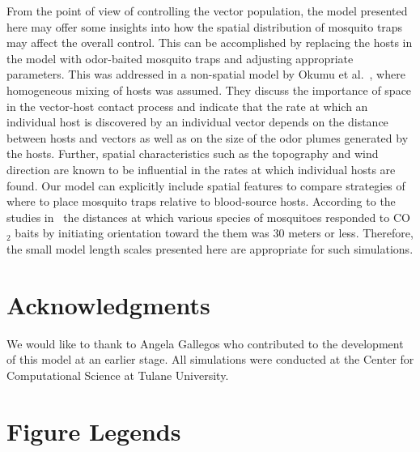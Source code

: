 \documentclass[10pt]{article}
\begin{document}
From the point of view of controlling the vector population, the model presented here may offer some insights into how the spatial distribution of mosquito traps may affect the overall control.  This can be accomplished by replacing the hosts in the model with odor-baited mosquito traps and adjusting appropriate parameters.  This was addressed in a non-spatial model by Okumu et al.~\cite{OkumuModel2010}, where homogeneous mixing of hosts was assumed.  They discuss the importance of space in the vector-host contact process and indicate that the rate at which an individual host is discovered by an individual vector depends on the distance between hosts and vectors as well as on the size of the odor plumes generated by the hosts.  Further, spatial characteristics such as the topography and wind direction are known to be influential in the rates at which individual hosts are found.  Our model can explicitly include spatial features to compare strategies of where to place mosquito traps relative to blood-source hosts.
According to the studies in~\cite{Gillies1972} the distances at which various species of mosquitoes responded to CO$_2$ baits by initiating orientation toward the them was 30 meters or less. Therefore, the small model length scales presented here are appropriate for such simulations.


\section*{Acknowledgments}
We would like to thank to Angela Gallegos  who contributed to the development of this model at an earlier stage. All simulations were conducted at the Center for Computational Science at Tulane University.



\newpage
\section*{Figure Legends}
\end{document}
